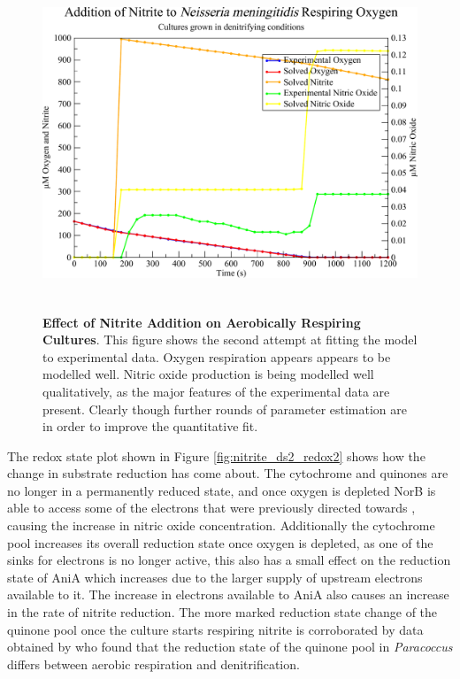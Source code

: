 \begin{figure}[tbp]
 \centering
 \includegraphics[height=10cm, clip=true]{./07-nitritereduction/data/dataset2-2.pdf}
 \caption[Effect of Nitrite Addition on Aerobically Respiring Cultures]{{\bf Effect of Nitrite Addition on Aerobically Respiring Cultures}. This figure shows the second attempt at fitting the model to experimental data. Oxygen respiration appears appears to be modelled well. Nitric oxide production is being modelled well qualitatively, as the major features of the experimental data are present. Clearly though further rounds of parameter estimation are in order to improve the quantitative fit.
  \label{fig:nitrite_ds2_solved2}}
\end{figure}

The redox state plot shown in Figure \ref{fig:nitrite_ds2_redox2} shows how the change in substrate reduction has come about. The cytochrome and quinones are no longer in a permanently reduced state, and once oxygen is depleted NorB is able to access some of the electrons that were previously directed towards \cbbthree{}, causing the increase in nitric oxide concentration. Additionally the cytochrome pool increases its overall reduction state once oxygen is depleted, as one of the sinks for electrons is no longer active, this also has a small effect on the reduction state of AniA which increases due to the larger supply of upstream electrons available to it. The increase in electrons available to AniA also causes an increase in the rate of nitrite reduction. The more marked reduction state change of the quinone pool once the culture starts respiring nitrite is corroborated by data obtained by \citet{Otten1999} who found that the reduction state of the quinone pool in \textit{Paracoccus} differs between aerobic respiration and denitrification.

